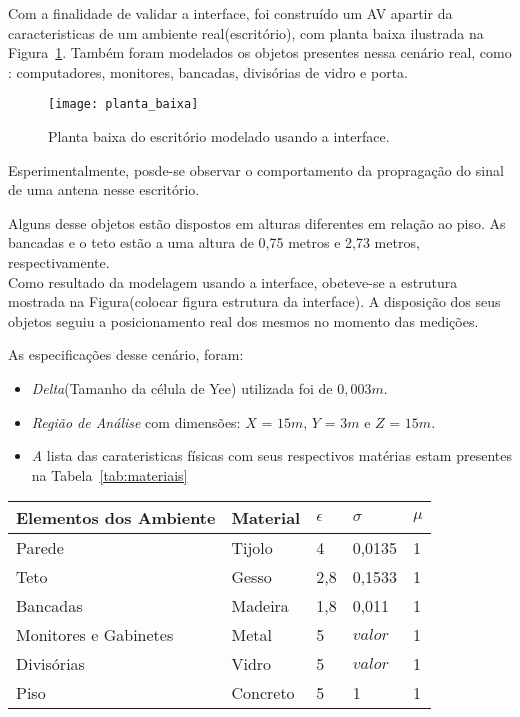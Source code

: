 Com a finalidade de validar a interface, foi construído um AV apartir da caracteristicas de um ambiente real(escritório), com planta baixa ilustrada na Figura~\ref{fg:planta_baixa}. Também foram modelados os objetos presentes nessa cenário real, como : computadores, monitores, bancadas, divisórias de vidro e porta.\\

\begin{figure}[ht!]
	\centering
	\texttt{[image: planta\_baixa]}
	\caption{Planta baixa do escritório modelado usando a interface.}
	\label{fg:planta_baixa}
\end{figure}

Esperimentalmente, posde-se observar o comportamento da propragação do sinal de uma antena nesse escritório. 

Alguns desse objetos estão dispostos em alturas diferentes em relação ao piso. As bancadas e o teto estão a uma altura de 0,75 metros e 2,73 metros, respectivamente.\\

Como resultado da modelagem usando a interface, obeteve-se a estrutura mostrada na Figura(colocar figura estrutura da interface). A disposição dos seus objetos seguiu a posicionamento real dos mesmos no momento das medições.

As especificações desse cenário, foram:
\begin{itemize}
\item \textit{Delta}(Tamanho da célula de Yee) utilizada foi de $0,003m$.
\item \textit{Região de Análise} com dimensões: $X$ = $15m$, $Y$ = $3m$ e $Z$ = $15m$.
\item \textit A lista das carateristicas físicas com seus respectivos matérias estam presentes na Tabela~\ref{tab:materiais}
\end{itemize}

\begin{center}
	\begin{tabular}{|l|l|l|l|l|}
	\hline
	Elementos dos Ambiente & Material & $\epsilon$ & $\sigma$ & $\mu$ \\ \hline
	Parede & Tijolo & 4 & 0,0135 & 1\\ \hline
	Teto & Gesso & 2,8 & 0,1533 & 1 \\ \hline
	Bancadas & Madeira & 1,8 & 0,011 & 1\\ \hline
	Monitores e Gabinetes & Metal & 5 & $valor$ & 1\\ \hline
	Divisórias & Vidro & 5 & $valor$ & 1 \\ \hline
	Piso & Concreto & 5 & 1 & 1 \\
	\hline
	\end{tabular}
	\label{tab:materiais}
\end{center}

